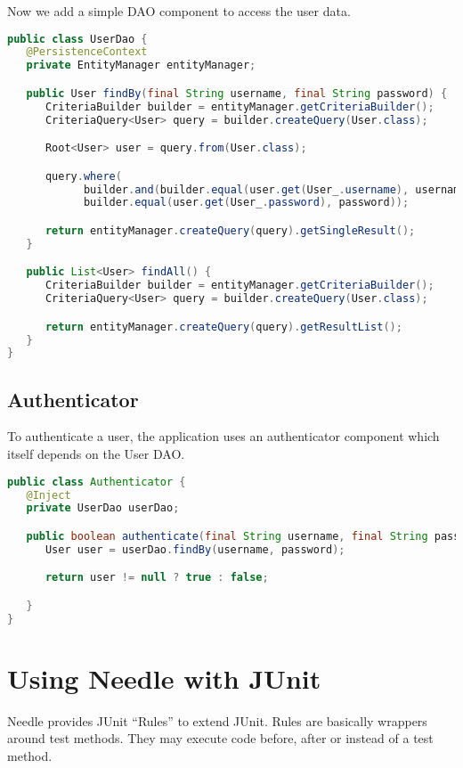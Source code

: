 Now we add a simple DAO component to access the user data.

\begin{lstlisting}[language={JAVA},caption=The User DAO component]
public class UserDao {
   @PersistenceContext
   private EntityManager entityManager;

   public User findBy(final String username, final String password) {
      CriteriaBuilder builder = entityManager.getCriteriaBuilder();
      CriteriaQuery<User> query = builder.createQuery(User.class);

      Root<User> user = query.from(User.class);

      query.where(
            builder.and(builder.equal(user.get(User_.username), username)),
            builder.equal(user.get(User_.password), password));

      return entityManager.createQuery(query).getSingleResult();
   }

   public List<User> findAll() {
      CriteriaBuilder builder = entityManager.getCriteriaBuilder();
      CriteriaQuery<User> query = builder.createQuery(User.class);

      return entityManager.createQuery(query).getResultList();
   }
}
\end{lstlisting}

\subsection{Authenticator}
To authenticate a user, the application uses an authenticator component which itself depends on the User DAO.

\begin{lstlisting}[language={JAVA},caption=The authenticator component]
public class Authenticator {
   @Inject
   private UserDao userDao;

   public boolean authenticate(final String username, final String password) {
      User user = userDao.findBy(username, password);

      return user != null ? true : false;

   }
}
\end{lstlisting}

\section{Using Needle with JUnit}
\label{sec: JUnit}

Needle provides JUnit ``Rules'' to extend JUnit. Rules are basically wrappers around test methods.
They may execute code before, after or instead of a test method.

